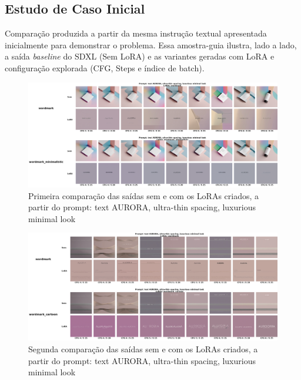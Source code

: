 \documentclass[12pt, %
openright, 
oneside, %
a4paper,    %
brazil]{facom-ufu-abntex2}
\begin{document}
\subsection{Estudo de Caso Inicial}

Comparação produzida a partir da mesma instrução textual apresentada inicialmente para demonstrar o problema. Essa amostra-guia ilustra, lado a lado, a saída \textit{baseline} do SDXL (Sem LoRA) e as variantes geradas com LoRA e configuração explorada (CFG, Steps e índice de batch).

\begin{figure}[H]
    \centering
	\includegraphics[width=\linewidth]{figuras/resultados/good/wordmark/cmp_p2_batch1.png}
	\caption[Primeira comparação das saídas sem e com os LoRAs criados, a partir do prompt ``AURORA''.]{Primeira comparação das saídas sem e com os LoRAs criados, a partir do prompt: text AURORA, ultra-thin spacing, luxurious minimal look}
	\label{fig:cmpP2Batch1}
\end{figure}

\begin{figure}[H]
    \centering
	\includegraphics[width=\linewidth]{figuras/resultados/good/wordmark/cmp_p2_batch3.png}
	\caption[Segunda comparação das saídas sem e com os LoRAs criados, a partir do prompt ``AURORA''.]{Segunda comparação das saídas sem e com os LoRAs criados, a partir do prompt: text AURORA, ultra-thin spacing, luxurious minimal look}
	\label{fig:cmpP2Batch3}
\end{figure}
\end{document}
